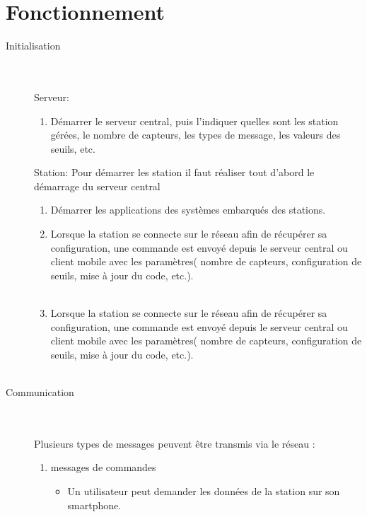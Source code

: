 \documentclass [a4paper] {report}
\begin{document}
\section{Fonctionnement}

\begin{description}

\item[Initialisation]\hfill\\
	\\Serveur:
	\begin{enumerate}
	\item Démarrer le serveur central, puis l'indiquer quelles sont les station gérées, le nombre de capteurs, les types de message, les valeurs des seuils, etc.\\
	\end{enumerate}
	Station: 
	Pour démarrer les station il faut réaliser tout d'abord le démarrage du serveur central
	\begin{enumerate}
	\item Démarrer les applications des systèmes embarqués des stations.
	\item Lorsque la station se connecte sur le réseau afin de récupérer sa configuration, une commande est envoyé 
	depuis le serveur central ou client mobile avec les paramètres( nombre de capteurs, configuration de seuils, mise à jour du code, etc.).\\\\
	\item Lorsque la station se connecte sur le réseau afin de récupérer sa configuration, une commande est envoyé depuis le serveur central ou client mobile avec les paramètres( nombre de capteurs, configuration de seuils, mise à jour du code, etc.).\\\\
	\end{enumerate}

\item [Communication]\hfill\\
	\\Plusieurs types de messages peuvent être transmis via le réseau :\\
	\begin{enumerate}
	\item messages de commandes \\
		\begin{itemize}
		\item Un utilisateur peut demander les données de la station sur son smartphone.\\


\end{itemize}
\end{enumerate}
\end{description}
\end{document}
